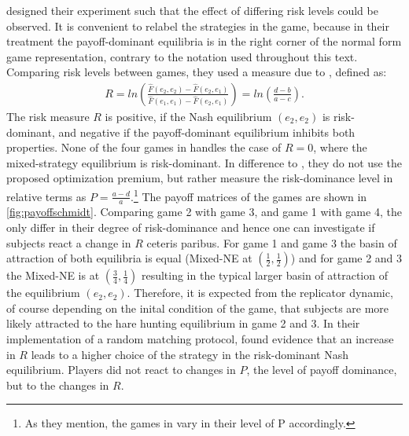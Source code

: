 \textcite{schmidt_playing_2003} designed their experiment such that the effect
of differing risk levels could be observed. It is convenient to relabel 
the strategies in the game, because in their treatment the payoff-dominant 
equilibria is in the right corner of the normal form game representation,
contrary to the notation used throughout this text. Comparing risk levels between
games, they used a measure due to \textcite{selten_axiomatic_1995}, defined
as:
\begin{align}
        \label{riskmeasureschmidt}
        R = ln\left(\frac{\hat{F}(e_2,e_2) -\hat{F}(e_2,e_1)}{\hat{F}(e_1,e_1) 
        -\hat{F}(e_2,e_1)}\right) = ln \left(\frac{d-b}{a-c}\right).
\end{align}
The risk measure $R$ is positive, if the Nash equilibrium $(e_2,e_2)$ is
risk-dominant, and negative if the payoff-dominant equilibrium inhibits both
properties.
None of the four games in \textcite{schmidt_playing_2003} handles
the case of $R=0$, where the mixed-strategy equilibrium is risk-dominant.
In difference to \textcite{battalio_optimization_2001}, they do not
use the proposed optimization premium, but rather measure the risk-dominance 
level in relative terms as $P=\frac{a-d}{a}$.\footnote{As they mention, the 
games in \textcite{battalio_optimization_2001} vary in their level of 
P accordingly.}
The payoff matrices of the games are shown in \ref{fig:payoffschmidt}.
Comparing game 2 with game 3, and game 1 with game 4, the 
only differ in their degree of risk-dominance and hence one can 
investigate if subjects react a change in $R$ ceteris paribus. 
For game 1 and game 3 the basin of attraction of both equilibria is equal 
(Mixed-NE at $(\frac 12, \frac 12)$) and  for
game 2 and 3 the Mixed-NE is at $(\frac 34,\frac 14)$ resulting in the 
typical  larger basin of attraction of the equilibrium $(e_2,e_2)$. 
Therefore, it is expected from the replicator dynamic, of course 
depending on the inital condition 
of the game, that subjects are more likely attracted to the hare hunting 
equilibrium in game 2 and 3. In their implementation of a 
random matching protocol, \textcite{schmidt_playing_2003} 
found evidence that an increase in $R$ leads to a higher choice 
of the strategy in the risk-dominant Nash equilibrium. Players did not react 
to changes in $P$, the level of payoff dominance, but to the changes in $R$.

